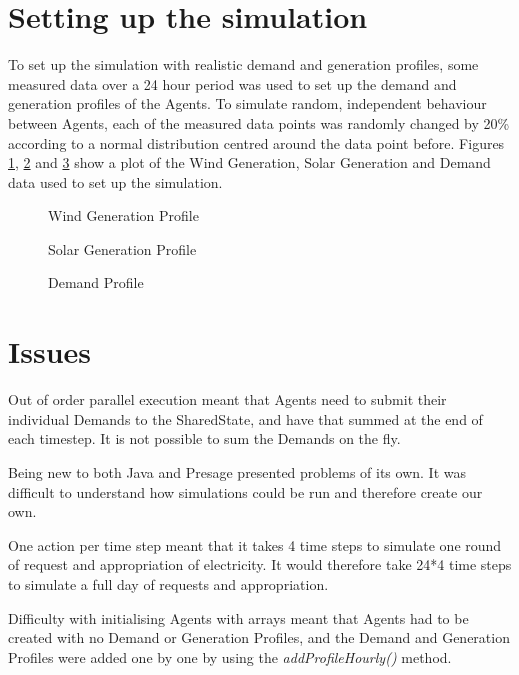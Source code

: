 \section*{Setting up the simulation}
To set up the simulation with realistic demand and generation profiles, some measured data over a 24 hour period was used to set up the demand and generation profiles of the Agents. To simulate random, independent behaviour between Agents, each of the measured data points was randomly changed by 20\% according to a normal distribution centred around the data point before. Figures \ref{fig:WindGenProfile}, \ref{fig:SolarGenProfile} and \ref{fig:DemandProfile} show a plot of the Wind Generation, Solar Generation and Demand data used to set up the simulation.

\begin{figure} 
	\centering \newlength\figureheight \newlength\figurewidth 
	\setlength\figureheight{6cm} 
	\setlength\figurewidth{13cm} 
	 
	\caption{Wind Generation Profile} 
	\label{fig:WindGenProfile} 
\end{figure}

\begin{figure} 
	\centering
	\setlength\figureheight{6cm} 
	\setlength\figurewidth{13cm} 
	 
	\caption{Solar Generation Profile} 
	\label{fig:SolarGenProfile} 
\end{figure}

\begin{figure} 
	\centering
	\setlength\figureheight{6cm} 
	\setlength\figurewidth{13cm} 
	 
	\caption{Demand Profile} 
	\label{fig:DemandProfile} 
\end{figure}

\section*{Issues}
Out of order parallel execution meant that Agents need to submit their individual Demands to the SharedState, and have that summed at the end of each timestep. It is not possible to sum the Demands on the fly.

Being new to both Java and Presage presented problems of its own. It was difficult to understand how simulations could be run and therefore create our own.

One action per time step meant that it takes 4 time steps to simulate one round of request and appropriation of electricity. It would therefore take 24*4 time steps to simulate a full day of requests and appropriation.

Difficulty with initialising Agents with arrays meant that Agents had to be created with no Demand or Generation Profiles, and the Demand and Generation Profiles were added one by one by using the \textit{addProfileHourly()} method.
